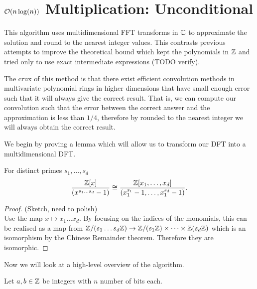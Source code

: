 \section{$\mathcal O(n\log(n))$ Multiplication: Unconditional}
\label{subsec:nlogn}

This algorithm uses multidimensional FFT transforms in ${\mathbb C}$ to approximate the solution and round to the nearest integer values. This contrasts previous attempts to improve the theoretical bound which kept the polynomials in ${\mathbb Z}$ and tried only to use exact intermediate expressions (TODO verify).


The crux of this method is that there exist efficient convolution methods in multivariate polynomial rings in higher dimensions that have small enough error such that it will always give the correct result. That is, we can compute our convolution such that the error between the correct answer and the approximation is less than $1 / 4$, therefore by rounded to the nearest integer we will always obtain the correct result.

We begin by proving a lemma which will allow us to transform our DFT into a multidimensional DFT.

\begin{lemma}
    For distinct primes $s_1, \ldots, s_d$ 
    \[
        \frac{{\mathbb Z}[x]}{(x^{s_1\ldots s_d} - 1)} \cong \frac{{\mathbb Z}[x_1, \ldots, x_d]}{(x_1^{s_1} - 1, \ldots, x_1^{s_d} - 1)}.
    \]
\end{lemma}

\begin{proof}
    (Sketch, need to polish)\\
    Use the map $x \mapsto x_1\ldots x_d$. By focusing on the indices of the monomials, this can be realised as a map from ${\mathbb Z}/(s_1\ldots s_d {\mathbb Z}) \to {\mathbb Z}/(s_1 {\mathbb Z}) \times \cdots \times {\mathbb Z}(s_d {\mathbb Z})$ which is an isomorphism by the Chinese Remainder theorem. Therefore they are isomorphic.
\end{proof}

Now we will look at a high-level overview of the algorithm.

Let $a, b \in {\mathbb Z}$ be integers with $n$ number of bits each.

